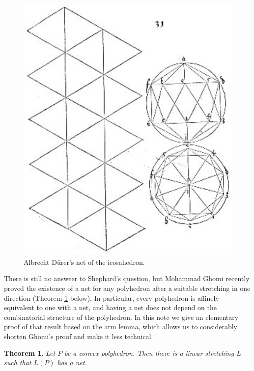 \documentclass{article}
\theoremstyle{theorem}
\newtheorem{teorema}{Theorem}
\begin{document}
\begin{figure}[h]
\centering
\includegraphics[scale=0.862]{IcosaDur.eps}
\caption{Albrecht D\"{u}rer's net of the icosahedron.}\label{Icos}
\end{figure}




There is still no answeer to Shephard's question, but Mohammad Ghomi \cite{Gh} recently proved the existence of a net for any polyhedron after a suitable stretching in one direction (Theorem \ref{Str} below). In particular, every polyhedron is affinely equivalent to one with a net, and having a net does not depend on the combinatorial structure of the polyhedron. In this note we give an elementary proof of that result based on the arm lemma, which allows us to considerably shorten Ghomi's proof and make it less technical.


\begin{teorema}\label{Str}
{Let $P$ be a convex polyhedron. Then there is a linear stretching $L$ such that $L(P)$ has a net.}
\end{teorema}
\end{document}
